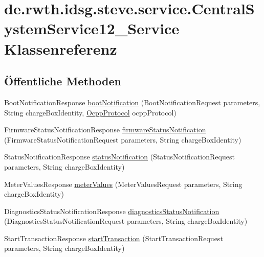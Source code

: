 \hypertarget{classde_1_1rwth_1_1idsg_1_1steve_1_1service_1_1_central_system_service12___service}{\section{de.\+rwth.\+idsg.\+steve.\+service.\+Central\+System\+Service12\+\_\+\+Service Klassenreferenz}
\label{classde_1_1rwth_1_1idsg_1_1steve_1_1service_1_1_central_system_service12___service}
}
\subsection*{Öffentliche Methoden}
\begin{DoxyCompactItemize}
\item 
Boot\+Notification\+Response \hyperlink{classde_1_1rwth_1_1idsg_1_1steve_1_1service_1_1_central_system_service12___service_a314eb1412d6594316923c548631eb470}{boot\+Notification} (Boot\+Notification\+Request parameters, String charge\+Box\+Identity, \hyperlink{enumde_1_1rwth_1_1idsg_1_1steve_1_1ocpp_1_1_ocpp_protocol}{Ocpp\+Protocol} ocpp\+Protocol)
\item 
Firmware\+Status\+Notification\+Response \hyperlink{classde_1_1rwth_1_1idsg_1_1steve_1_1service_1_1_central_system_service12___service_ac663d9f960b1a5c8f4e1d667613573f0}{firmware\+Status\+Notification} (Firmware\+Status\+Notification\+Request parameters, String charge\+Box\+Identity)
\item 
Status\+Notification\+Response \hyperlink{classde_1_1rwth_1_1idsg_1_1steve_1_1service_1_1_central_system_service12___service_a70def548308d0f0109ab2416739ea397}{status\+Notification} (Status\+Notification\+Request parameters, String charge\+Box\+Identity)
\item 
Meter\+Values\+Response \hyperlink{classde_1_1rwth_1_1idsg_1_1steve_1_1service_1_1_central_system_service12___service_a0150028cdc98be759dcd47318459bead}{meter\+Values} (Meter\+Values\+Request parameters, String charge\+Box\+Identity)
\item 
Diagnostics\+Status\+Notification\+Response \hyperlink{classde_1_1rwth_1_1idsg_1_1steve_1_1service_1_1_central_system_service12___service_a13aa6d74925c5b701cf56b1f29671302}{diagnostics\+Status\+Notification} (Diagnostics\+Status\+Notification\+Request parameters, String charge\+Box\+Identity)
\item 
Start\+Transaction\+Response \hyperlink{classde_1_1rwth_1_1idsg_1_1steve_1_1service_1_1_central_system_service12___service_a7a89e52be0598991316dce0e6c5d9608}{start\+Transaction} (Start\+Transaction\+Request parameters, String charge\+Box\+Identity)

\end{DoxyCompactItemize}
